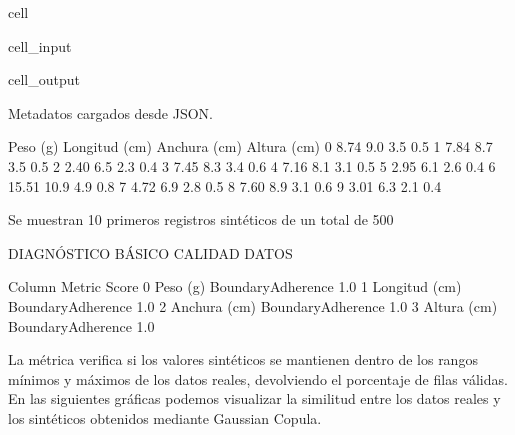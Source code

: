 \documentclass[a4paper,10pt,spanish]{jupyterBook}
\begin{document}
\begin{sphinxuseclass}{cell}
\begin{sphinxVerbatimInput}
\begin{sphinxuseclass}{cell_input}
\end{sphinxuseclass}\end{sphinxVerbatimInput}
\begin{sphinxVerbatimOutput}

\begin{sphinxuseclass}{cell_output}
\begin{sphinxVerbatim}[commandchars=\\\{\}]
Metadatos cargados desde JSON.
\end{sphinxVerbatim}

\begin{sphinxVerbatim}[commandchars=\\\{\}]
   Peso (g)  Longitud (cm)  Anchura (cm)  Altura (cm)
0      8.74            9.0           3.5          0.5
1      7.84            8.7           3.5          0.5
2      2.40            6.5           2.3          0.4
3      7.45            8.3           3.4          0.6
4      7.16            8.1           3.1          0.5
5      2.95            6.1           2.6          0.4
6     15.51           10.9           4.9          0.8
7      4.72            6.9           2.8          0.5
8      7.60            8.9           3.1          0.6
9      3.01            6.3           2.1          0.4
\end{sphinxVerbatim}

\begin{sphinxVerbatim}[commandchars=\\\{\}]
Se muestran 10 primeros registros sintéticos de un total de 500

DIAGNÓSTICO BÁSICO CALIDAD DATOS

          Column             Metric  Score
0       Peso (g)  BoundaryAdherence    1.0
1  Longitud (cm)  BoundaryAdherence    1.0
2   Anchura (cm)  BoundaryAdherence    1.0
3    Altura (cm)  BoundaryAdherence    1.0
\end{sphinxVerbatim}

\end{sphinxuseclass}\end{sphinxVerbatimOutput}

\end{sphinxuseclass}
\sphinxAtStartPar
La métrica  verifica si los valores sintéticos se mantienen dentro de los rangos mínimos y máximos de los datos reales, devolviendo el porcentaje de filas válidas. En las siguientes gráficas podemos visualizar la similitud entre los datos reales y los sintéticos obtenidos mediante Gaussian Copula.
\end{document}
